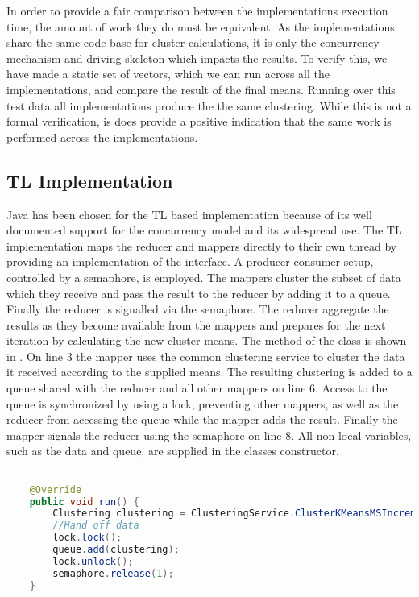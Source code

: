 In order to provide a fair comparison between the implementations execution time, the amount of work they do must be equivalent. As the implementations share the same code base for cluster calculations, it is only the concurrency mechanism and driving skeleton which impacts the results. To verify this, we have made a static set of vectors, which we can run across all the implementations, and compare the result of the final means. Running over this test data all implementations produce the the same clustering. While this is not a formal verification, is does provide a positive indication that the same work is performed across the implementations.

\subsection{\ac{TL} Implementation}
Java has been chosen for the \ac{TL} based implementation because of its well documented support for the concurrency model and its widespread use. The \ac{TL} implementation maps the reducer and mappers directly to their own thread by providing an implementation of the  interface. A producer consumer setup, controlled by a semaphore, is employed. The mappers cluster the subset of data which they receive and pass the result to the reducer by adding it to a queue. Finally the reducer is signalled via the semaphore. The reducer aggregate the results as they become available from the mappers  and prepares for the next iteration by calculating the new cluster means. The  method of the  class is shown in . On line 3 the mapper uses the common clustering service to cluster the data it received according to the supplied means. The resulting clustering is added to a queue shared with the reducer and all other mappers on line 6. Access to the queue is synchronized by using a lock, preventing other mappers, as well as the reducer from accessing the queue while the mapper adds the result. Finally the mapper signals the reducer using the semaphore on line 8. All non local variables, such as the data and queue, are supplied in the  classes constructor.

\begin{lstlisting}[float,label=lst:tl_implementation,
  caption={\ac{TL} Implementation},
  language=Java,  
  showspaces=false,
  showtabs=false,
  breaklines=true,
  showstringspaces=false,
  breakatwhitespace=true,
  commentstyle=\color{greencomments},
  keywordstyle=\color{bluekeywords},
  stringstyle=\color{redstrings}]  % Start your code-block

    @Override
    public void run() {
        Clustering clustering = ClusteringService.ClusterKMeansMSIncremental(data, means);
        //Hand off data
        lock.lock();
        queue.add(clustering);
        lock.unlock();
        semaphore.release(1);
    }  
\end{lstlisting}

